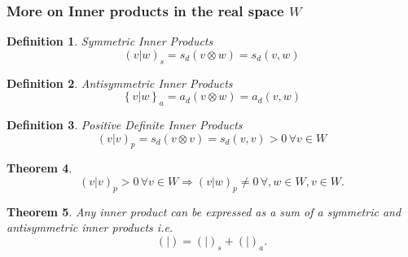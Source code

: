 \documentclass[aps,preprint]{revtex4}
\newtheorem{theorem}{Theorem}
\newtheorem{definition}[theorem]{Definition}
\begin{document}
\subsubsection{\textbf{More on Inner products in the real space} $W$}

\begin{definition}
Symmetric Inner Products 
\begin{equation}
\left( \left. v\right\vert w\right) _{s}=s_{d}\left( v\otimes w\right)
=s_{d}\left( v,w\right)
\end{equation}
\end{definition}

\begin{definition}
Antisymmetric Inner Products 
\begin{equation}
\left\{ \left. v\right\vert w\right\} _{a}=a_{d}\left( v\otimes w\right)
=a_{d}\left( v,w\right)
\end{equation}
\end{definition}

\begin{definition}
Positive Definite Inner Products 
\begin{equation}
\left( \left. v\right\vert v\right) _{p}=s_{d}\left( v\otimes v\right)
=s_{d}\left( v,v\right) >0\,\forall v\in W
\end{equation}
\end{definition}

\begin{theorem}
\begin{equation}
\left( \left. v\right\vert v\right) _{p}>0\,\forall v\in W\Rightarrow \left(
\left. v\right\vert w\right) _{p}\neq 0\,\forall ,w\in W,v\in W.
\end{equation}
\end{theorem}

\begin{theorem}
Any inner product can be expressed as a sum of a symmetric and antisymmetric
inner products i.e. 
\begin{equation}
\left( \left. {}\right\vert \right) =\left( \left. {}\right\vert \right)
_{s}+\left( \left. {}\right\vert \right) _{a}.
\end{equation}
\end{theorem}
\end{document}
